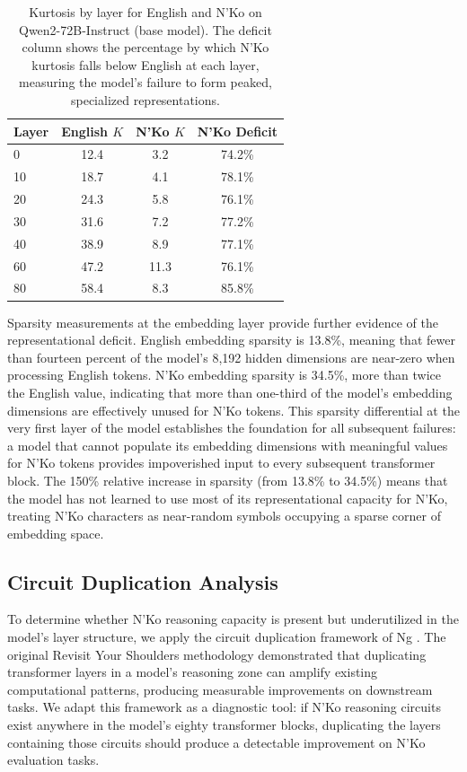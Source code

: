 \documentclass[11pt]{article}
\newcommand{\nko}{N'Ko}
\begin{document}
\begin{table}[t]
\centering
\small
\caption{Kurtosis by layer for English and \nko{} on Qwen2-72B-Instruct (base model). The deficit column shows the percentage by which \nko{} kurtosis falls below English at each layer, measuring the model's failure to form peaked, specialized representations.}
\label{tab:kurtosis}
\begin{tabular}{@{}lccc@{}}
\toprule
Layer & English $K$ & \nko{} $K$ & \nko{} Deficit \\
\midrule
0 & 12.4 & 3.2 & 74.2\% \\
10 & 18.7 & 4.1 & 78.1\% \\
20 & 24.3 & 5.8 & 76.1\% \\
30 & 31.6 & 7.2 & 77.2\% \\
40 & 38.9 & 8.9 & 77.1\% \\
60 & 47.2 & 11.3 & 76.1\% \\
80 & 58.4 & 8.3 & 85.8\% \\
\bottomrule
\end{tabular}
\end{table}

Sparsity measurements at the embedding layer provide further evidence of the representational deficit. English embedding sparsity is 13.8\%, meaning that fewer than fourteen percent of the model's 8,192 hidden dimensions are near-zero when processing English tokens. \nko{} embedding sparsity is 34.5\%, more than twice the English value, indicating that more than one-third of the model's embedding dimensions are effectively unused for \nko{} tokens. This sparsity differential at the very first layer of the model establishes the foundation for all subsequent failures: a model that cannot populate its embedding dimensions with meaningful values for \nko{} tokens provides impoverished input to every subsequent transformer block. The 150\% relative increase in sparsity (from 13.8\% to 34.5\%) means that the model has not learned to use most of its representational capacity for \nko{}, treating \nko{} characters as near-random symbols occupying a sparse corner of embedding space.

\subsection{Circuit Duplication Analysis}
\label{sec:circuit_dup}

To determine whether \nko{} reasoning capacity is present but underutilized in the model's layer structure, we apply the circuit duplication framework of Ng \cite{ng2024rys}. The original Revisit Your Shoulders methodology demonstrated that duplicating transformer layers in a model's reasoning zone can amplify existing computational patterns, producing measurable improvements on downstream tasks. We adapt this framework as a diagnostic tool: if \nko{} reasoning circuits exist anywhere in the model's eighty transformer blocks, duplicating the layers containing those circuits should produce a detectable improvement on \nko{} evaluation tasks.
\end{document}
